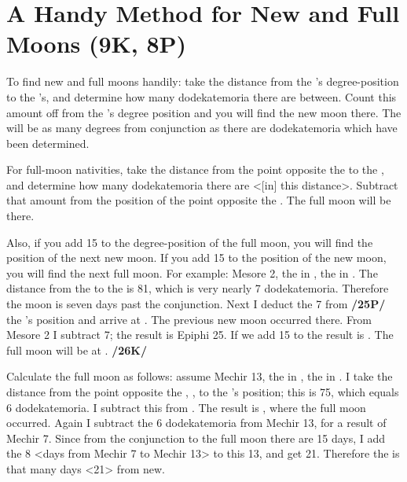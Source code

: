 \section{A Handy Method for New and Full Moons (9K, 8P)}

To find new and full moons handily: take the distance from the \Sun’s degree-position to the \Moon’s, and determine how many dodekatemoria there are between. Count this amount off from the \Sun’s degree position and you will find the new moon there. The \Moon\xspace will be as many degrees from conjunction as there are dodekatemoria which have been determined. 

For full-moon nativities, take the distance from the point opposite the \Sun\xspace to the \Moon, and determine how many dodekatemoria there are <[in] this distance>. Subtract that amount from the position of the point opposite the \Sun. The full moon will be there. 

Also, if you add 15\deg\xspace to the degree-position of the full moon, you will find the position of the next new moon. If you add 15\deg\xspace to the position of the new moon, you will find the next full moon. For example: Mesore 2, the \Sun\xspace in \Leo\xspace 5\deg, the \Moon\xspace in \Libra\xspace 26\deg. The distance from the \Sun\xspace to the \Moon\xspace is 81\deg, which is very nearly 7 dodekatemoria. Therefore the moon is seven days past the conjunction. Next I deduct the 7 from \textbf{/25P/} the \Sun’s position and arrive at \Cancer\xspace 28\deg. The previous new moon occurred there. From Mesore 2 I subtract 7; the result is Epiphi 25. If we add 15 to \Cancer\xspace 28\deg
the result is \Leo\xspace 13\deg. The full moon will be at \Aquarius\xspace 13\deg. \textbf{/26K/} 

Calculate the full moon as follows: assume Mechir 13, the \Sun\xspace in \Aquarius\xspace 22\deg, the \Moon\xspace in \Scorpio\xspace 7\deg. I take the distance from the point opposite the \Sun, \Leo\xspace 22\deg, to the \Moon’s position; this is
75\deg, which equals 6 dodekatemoria. I subtract this from \Leo\xspace 22\deg. The result is \Leo\xspace 16\deg, where the full moon occurred. Again I subtract the 6 dodekatemoria from Mechir 13, for a result of Mechir 7. Since from the conjunction to the full moon there are 15 days, I add the 8 <days from Mechir 7 to Mechir 13> to this 13, and get 21. Therefore the \Moon\xspace is that many days <21> from new.

\newpage